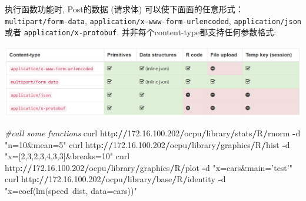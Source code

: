 \documentclass[]{book}
\newenvironment{Shaded}{\begin{snugshade}}{\end{snugshade}}
\newcommand{\FloatTok}[1]{\textcolor[rgb]{0.00,0.00,0.81}{#1}}
\newcommand{\StringTok}[1]{\textcolor[rgb]{0.31,0.60,0.02}{#1}}
\newcommand{\CommentTok}[1]{\textcolor[rgb]{0.56,0.35,0.01}{\textit{#1}}}
\newcommand{\OperatorTok}[1]{\textcolor[rgb]{0.81,0.36,0.00}{\textbf{#1}}}
\newcommand{\ErrorTok}[1]{\textcolor[rgb]{0.64,0.00,0.00}{\textbf{#1}}}
\newcommand{\NormalTok}[1]{#1}
\begin{document}
执行函数功能时, Post的数据 (请求体)
可以使下面面的任意形式：\texttt{multipart/form-data},
\texttt{application/x-www-form-urlencoded}, \texttt{application/json}
或者 \texttt{application/x-protobuf}.
并非每个content-type都支持任何参数格式:

\includegraphics{pic/opencpu/p9.png}

\begin{Shaded}
\begin{Highlighting}[]
\CommentTok{#call some functions}
\NormalTok{curl http}\OperatorTok{:}\ErrorTok{//}\FloatTok{172.16}\NormalTok{.}\FloatTok{100.202}\OperatorTok{/}\NormalTok{ocpu}\OperatorTok{/}\NormalTok{library}\OperatorTok{/}\NormalTok{stats}\OperatorTok{/}\NormalTok{R}\OperatorTok{/}\NormalTok{rnorm }\OperatorTok{-}\NormalTok{d }\StringTok{"n=10&mean=5"}
\NormalTok{curl http}\OperatorTok{:}\ErrorTok{//}\FloatTok{172.16}\NormalTok{.}\FloatTok{100.202}\OperatorTok{/}\NormalTok{ocpu}\OperatorTok{/}\NormalTok{library}\OperatorTok{/}\NormalTok{graphics}\OperatorTok{/}\NormalTok{R}\OperatorTok{/}\NormalTok{hist }\OperatorTok{-}\NormalTok{d }\StringTok{"x=[2,3,2,3,4,3,3]&breaks=10"}
\NormalTok{curl http}\OperatorTok{:}\ErrorTok{//}\FloatTok{172.16}\NormalTok{.}\FloatTok{100.202}\OperatorTok{/}\NormalTok{ocpu}\OperatorTok{/}\NormalTok{library}\OperatorTok{/}\NormalTok{graphics}\OperatorTok{/}\NormalTok{R}\OperatorTok{/}\NormalTok{plot }\OperatorTok{-}\NormalTok{d }\StringTok{"x=cars&main='test'"}
\NormalTok{curl http}\OperatorTok{:}\ErrorTok{//}\FloatTok{172.16}\NormalTok{.}\FloatTok{100.202}\OperatorTok{/}\NormalTok{ocpu}\OperatorTok{/}\NormalTok{library}\OperatorTok{/}\NormalTok{base}\OperatorTok{/}\NormalTok{R}\OperatorTok{/}\NormalTok{identity }\OperatorTok{-}\NormalTok{d }\StringTok{"x=coef(lm(speed~dist, data=cars))"}
\end{Highlighting}
\end{Shaded}
\end{document}

